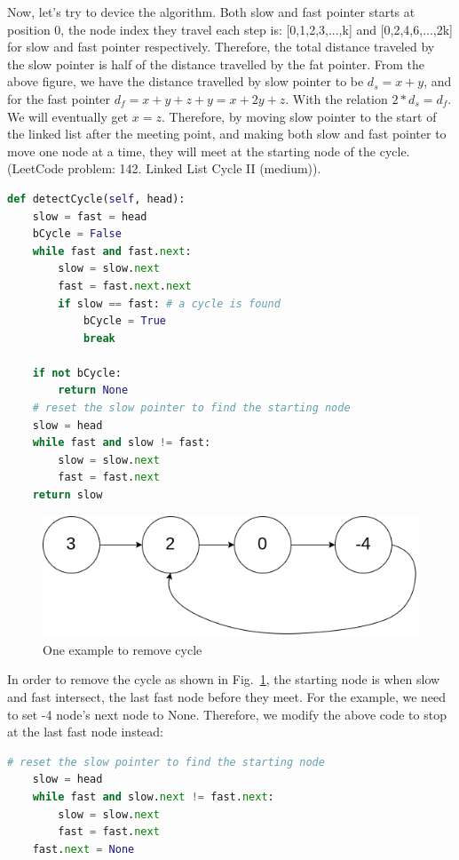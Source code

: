 \documentclass[../searching.tex]{subfiles}
\begin{document}
Now, let's try to device the algorithm. Both slow and fast pointer starts at position 0, the node index they travel each step is: [0,1,2,3,...,k] and [0,2,4,6,...,2k] for slow and fast pointer respectively. Therefore, the total distance traveled by the slow pointer is half of the distance travelled by the fat pointer. From the above figure, we have the distance travelled by slow pointer to be $d_s = x+y$, and for the fast pointer $d_f = x+y+z+y = x+2y+z$. With the relation $2*d_s = d_f$. We will eventually get $x = z$. Therefore, by moving slow pointer to the start of the linked list after the meeting point, and making both slow and fast pointer to move one node at a time, they will meet at the starting node of the cycle. (LeetCode problem: 142. Linked List Cycle II (medium)).
\begin{lstlisting}[language=Python]
def detectCycle(self, head):
    slow = fast = head
    bCycle = False
    while fast and fast.next:
        slow = slow.next
        fast = fast.next.next
        if slow == fast: # a cycle is found
            bCycle = True
            break
    
    if not bCycle:
        return None
    # reset the slow pointer to find the starting node       
    slow = head
    while fast and slow != fast:
        slow = slow.next
        fast = fast.next
    return slow
\end{lstlisting}
\begin{figure}[h!]
    \centering
    \includegraphics[width=0.6\columnwidth]{fig/circularlinkedlist.png}
    \caption{One example to remove cycle}
    \label{fig:cycle_remove}
\end{figure}
In order to remove the cycle as shown in Fig.~\ref{fig:cycle_remove}, the starting node is when slow and fast intersect, the last fast node before they meet. For the example, we need to set -4 node's next node to None. Therefore, we modify the above code to stop at the last fast node instead:
\begin{lstlisting}[language=Python]
    # reset the slow pointer to find the starting node       
    slow = head
    while fast and slow.next != fast.next:
        slow = slow.next
        fast = fast.next
    fast.next = None
\end{lstlisting}
\end{document}

